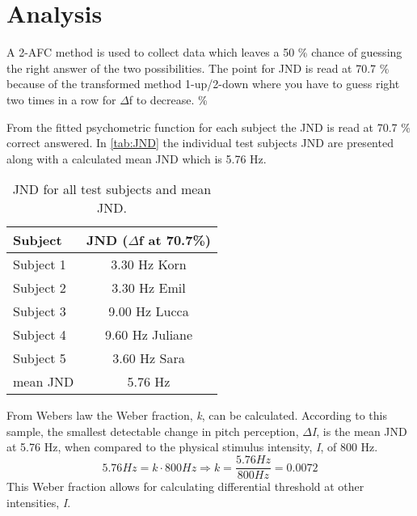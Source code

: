 \section*{Analysis}
A 2-AFC method is used to collect data which leaves a 50 \% chance of guessing the right answer of the two possibilities. The point for JND is read at 70.7 \% because of the transformed method 1-up/2-down where you have to guess right two times in a row for $\Delta$f to decrease.
\%

From the fitted psychometric function for each subject the JND is read at 70.7 \% correct answered. In \autoref{tab:JND} the individual test subjects JND are presented along with a calculated mean JND which is 5.76 Hz. 
%
\begin{table}[H]
	\centering
	\begin{tabular}{l|c}
		Subject     & JND ($\Delta$f at 70.7\%) \\\hline
		Subject 1   & 3.30 Hz  Korn            \\\hline
		Subject 2   & 3.30 Hz Emil            \\\hline
		Subject 3   & 9.00 Hz Lucca             \\\hline
		Subject 4   & 9.60 Hz Juliane           \\\hline
		Subject 5   & 3.60 Hz Sara              \\\hline
		mean JND &    5.76 Hz   
	\end{tabular}
	\caption{JND for all test subjects and mean JND.}
	\label{tab:JND}         
\end{table}
\noindent
%
From Webers law the Weber fraction, \textit{k}, can be calculated. According to this sample, the smallest detectable change in pitch perception, \textit{$\Delta$I}, is the mean JND at 5.76 Hz, when compared to the physical stimulus intensity, \textit{I}, of 800 Hz.
% 
\begin{equation}
5.76 Hz = k \cdot 800 Hz \Rightarrow k = \frac{5.76 Hz}{800 Hz} = 0.0072
\end{equation}
%
This Weber fraction allows for calculating differential threshold at other intensities, \textit{I}. 
%

